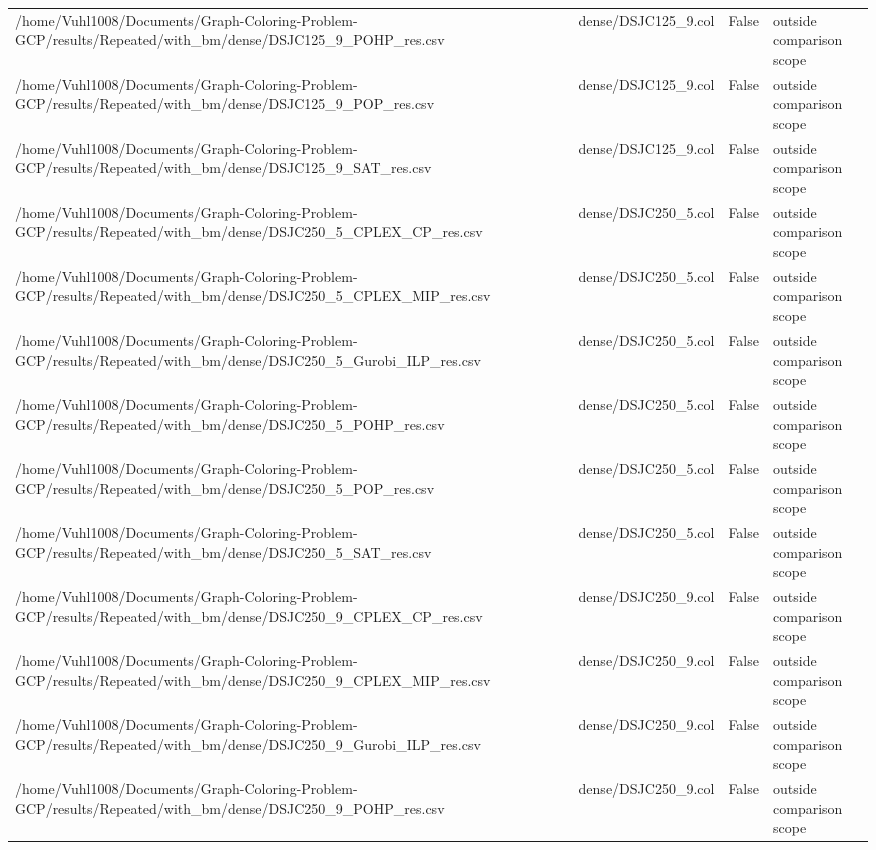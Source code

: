 \begin{table}[htbp]
\begin{tabular}{llll}
/home/Vuhl1008/Documents/Graph-Coloring-Problem-GCP/results/Repeated/with\_bm/dense/DSJC125\_9\_POHP\_res.csv & dense/DSJC125\_9.col & False & outside comparison scope \\
/home/Vuhl1008/Documents/Graph-Coloring-Problem-GCP/results/Repeated/with\_bm/dense/DSJC125\_9\_POP\_res.csv & dense/DSJC125\_9.col & False & outside comparison scope \\
/home/Vuhl1008/Documents/Graph-Coloring-Problem-GCP/results/Repeated/with\_bm/dense/DSJC125\_9\_SAT\_res.csv & dense/DSJC125\_9.col & False & outside comparison scope \\
/home/Vuhl1008/Documents/Graph-Coloring-Problem-GCP/results/Repeated/with\_bm/dense/DSJC250\_5\_CPLEX\_CP\_res.csv & dense/DSJC250\_5.col & False & outside comparison scope \\
/home/Vuhl1008/Documents/Graph-Coloring-Problem-GCP/results/Repeated/with\_bm/dense/DSJC250\_5\_CPLEX\_MIP\_res.csv & dense/DSJC250\_5.col & False & outside comparison scope \\
/home/Vuhl1008/Documents/Graph-Coloring-Problem-GCP/results/Repeated/with\_bm/dense/DSJC250\_5\_Gurobi\_ILP\_res.csv & dense/DSJC250\_5.col & False & outside comparison scope \\
/home/Vuhl1008/Documents/Graph-Coloring-Problem-GCP/results/Repeated/with\_bm/dense/DSJC250\_5\_POHP\_res.csv & dense/DSJC250\_5.col & False & outside comparison scope \\
/home/Vuhl1008/Documents/Graph-Coloring-Problem-GCP/results/Repeated/with\_bm/dense/DSJC250\_5\_POP\_res.csv & dense/DSJC250\_5.col & False & outside comparison scope \\
/home/Vuhl1008/Documents/Graph-Coloring-Problem-GCP/results/Repeated/with\_bm/dense/DSJC250\_5\_SAT\_res.csv & dense/DSJC250\_5.col & False & outside comparison scope \\
/home/Vuhl1008/Documents/Graph-Coloring-Problem-GCP/results/Repeated/with\_bm/dense/DSJC250\_9\_CPLEX\_CP\_res.csv & dense/DSJC250\_9.col & False & outside comparison scope \\
/home/Vuhl1008/Documents/Graph-Coloring-Problem-GCP/results/Repeated/with\_bm/dense/DSJC250\_9\_CPLEX\_MIP\_res.csv & dense/DSJC250\_9.col & False & outside comparison scope \\
/home/Vuhl1008/Documents/Graph-Coloring-Problem-GCP/results/Repeated/with\_bm/dense/DSJC250\_9\_Gurobi\_ILP\_res.csv & dense/DSJC250\_9.col & False & outside comparison scope \\
/home/Vuhl1008/Documents/Graph-Coloring-Problem-GCP/results/Repeated/with\_bm/dense/DSJC250\_9\_POHP\_res.csv & dense/DSJC250\_9.col & False & outside comparison scope \\

\end{tabular}
\end{table}
